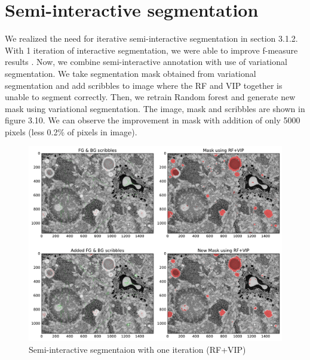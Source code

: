 
\section{Semi-interactive segmentation}
We realized the need for iterative semi-interactive segmentation in section 3.1.2. With 1 iteration of interactive segmentation, we were able to improve f-measure results . Now, we combine semi-interactive annotation with use of variational segmentation. We take segmentation mask obtained from variational segmentation and add scribbles to image where the RF and VIP together is unable to segment correctly. Then, we retrain Random forest and generate new mask using variational segmentation. The image, mask and scribbles are shown in figure 3.10. We can observe the improvement in mask with addition of only 5000 pixels (less 0.2\% of pixels in image).
\begin{figure}[h!] \label{fig:semi-rf}
 \includegraphics[width=1.0\linewidth]{figures/semi_inter_vip.pdf}
\caption{Semi-interactive segmentaion with one iteration (RF+VIP)}
\end{figure}

